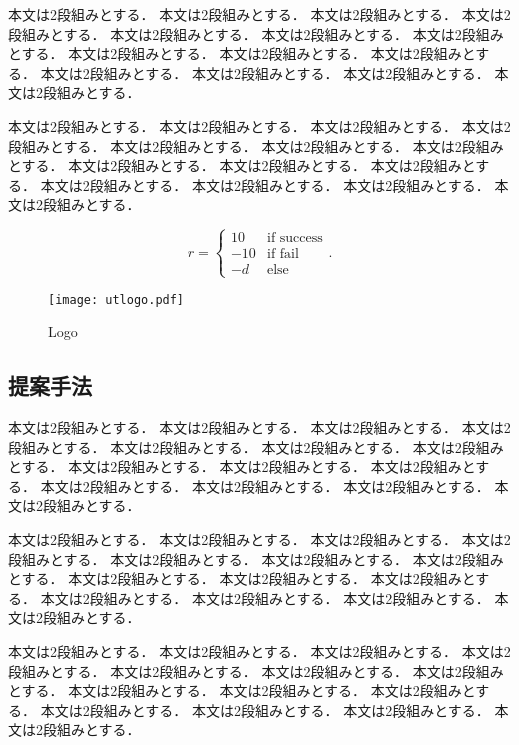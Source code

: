 \documentclass{/workdir/classes/summary}
\begin{document}
本文は2段組みとする．
本文は2段組みとする．
本文は2段組みとする．
本文は2段組みとする．
本文は2段組みとする．
本文は2段組みとする．
本文は2段組みとする．
本文は2段組みとする．
本文は2段組みとする．
本文は2段組みとする．
本文は2段組みとする．
本文は2段組みとする．
本文は2段組みとする．
本文は2段組みとする．

本文は2段組みとする．
本文は2段組みとする．
本文は2段組みとする．
本文は2段組みとする．
本文は2段組みとする．
本文は2段組みとする．
本文は2段組みとする．
本文は2段組みとする．
本文は2段組みとする．
本文は2段組みとする．
本文は2段組みとする．
本文は2段組みとする．
本文は2段組みとする．
本文は2段組みとする．

\begin{equation}
  r = \left\{
    \begin{array}{cc}
      10   & \text{if success} \\
      - 10 & \text{if fail}    \\
      - d  & \text{else}
    \end{array}
  \right. \text{.}
\end{equation}

\begin{figure}[tb]
  \centering
  \texttt{[image: utlogo.pdf]}
  \caption{Logo}
  \label{fig:logo}
\end{figure}

\subsection{提案手法}
本文は2段組みとする．
本文は2段組みとする．
本文は2段組みとする．
本文は2段組みとする．
本文は2段組みとする．
本文は2段組みとする．
本文は2段組みとする．
本文は2段組みとする．
本文は2段組みとする．
本文は2段組みとする．
本文は2段組みとする．
本文は2段組みとする．
本文は2段組みとする．
本文は2段組みとする．

本文は2段組みとする．
本文は2段組みとする．
本文は2段組みとする．
本文は2段組みとする．
本文は2段組みとする．
本文は2段組みとする．
本文は2段組みとする．
本文は2段組みとする．
本文は2段組みとする．
本文は2段組みとする．
本文は2段組みとする．
本文は2段組みとする．
本文は2段組みとする．
本文は2段組みとする．

本文は2段組みとする．
本文は2段組みとする．
本文は2段組みとする．
本文は2段組みとする．
本文は2段組みとする．
本文は2段組みとする．
本文は2段組みとする．
本文は2段組みとする．
本文は2段組みとする．
本文は2段組みとする．
本文は2段組みとする．
本文は2段組みとする．
本文は2段組みとする．
本文は2段組みとする．
\end{document}
